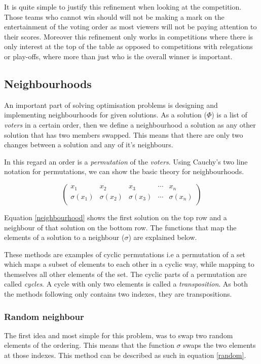 \documentclass[12pt]{report}
\begin{document}
It is quite simple to justify this refinement when looking at the competition. Those teams who cannot win should will not be making a mark on the entertainment of the voting order as most viewers will not be paying attention to their scores. Moreover this refinement only works in competitions where there is only interest at the top of the table as opposed to competitions with relegations or play-offs, where more than just who is the overall winner is important.

\subsection{Neighbourhoods}\label{Neighbours}
An important part of solving optimisation problems is designing and implementing neighbourhoods for given solutions. As a solution ($\Phi$) is a list of \textit{voters} in a certain order, then we define a neighbourhood a solution as any other solution that has two members swapped. This means that there are only two changes between a solution and any of it's neighbours.

In this regard an order is a \textit{permutation} of the \textit{voters}. Using Cauchy's two line notation for permutations\cite{Cauchy}, we can show the basic theory for neighbourhoods.

\begin{equation}\label{neighbourhood}
\begin{pmatrix}
x_{1} & x_{2} & x_{3} & \cdots & x_{n} \\
\sigma(x_{1}) & \sigma(x_{2}) & \sigma(x_{3}) & \cdots & \sigma(x_{n}) \\
\end{pmatrix}
\end{equation}

Equation \ref{neighbourhood} shows the first solution on the top row and a neighbour of that solution on the bottom row. The functions that map the elements of a solution to a neighbour ($\sigma$) are explained below.

These methods are examples of cyclic permutations i.e a permutation of a set which maps a subset of elements to each other in a cyclic way, while mapping to themselves all other elements of the set. The cyclic parts of a permutation are called \textit{cycles}. A cycle with only two elements is called a \textit{transposition}\cite{cyclicPerm}. As both the methods following only contains two indexes, they are transpositions.

\subsubsection{Random neighbour}
The first idea and most simple for this problem, was to swap two random elements of the ordering. This means that the function $\sigma$ swaps the two elements at those indexes. This method can be described as such in equation \ref{random}.
\end{document}
